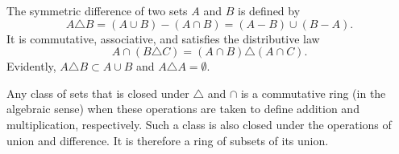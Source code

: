 The symmetric difference of two sets $A$ and $B$ is defined by
$$A \triangle B = (A \cup B) - (A \cap B) = (A - B) \cup (B - A).$$
It is commutative, associative, and satisfies the distributive law
$$A \cap (B \triangle C) = (A \cap B) \triangle (A \cap C).$$
Evidently, $A \triangle B \subset A \cup B$ and $A \triangle A = \emptyset$.

Any class of sets that is closed under $\triangle$ and $\cap$ is a commutative ring (in the algebraic sense) when these operations are taken to define addition and multiplication, respectively. Such a class is also closed under the operations of union and difference. It is therefore a ring of subsets of its union.
